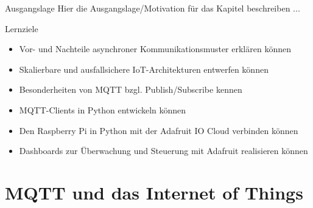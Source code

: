 \begin{frame}{Ausgangslage}
    Hier die Ausgangslage/Motivation für das Kapitel beschreiben ...

\end{frame}

\begin{frame}{Lernziele}
    \begin{itemize}
        \item Vor- und Nachteile asynchroner Kommunikationsmuster erklären können
        \item Skalierbare und ausfallsichere IoT-Architekturen entwerfen können
        \item Besonderheiten von MQTT bzgl. Publish/Subscribe kennen
        \item MQTT-Clients in Python entwickeln können
        \item Den Raspberry Pi in Python mit der Adafruit IO Cloud verbinden können
        \item Dashboards zur Überwachung und Steuerung mit Adafruit realisieren können
    \end{itemize}
\end{frame}





\section{MQTT und das Internet of Things}

